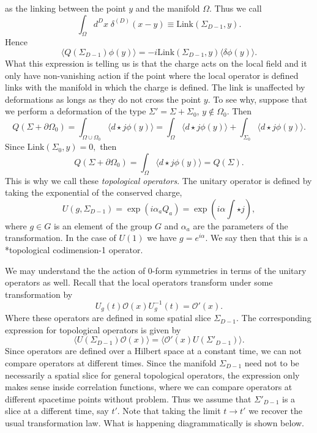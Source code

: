 \documentclass{article}
\begin{document}
as the linking between the point $y$ and the manifold $\Omega$. Thus we call  
$$
\int_{\Omega}d^Dx\;\delta^{(D)}(x-y)\equiv \text{Link}(\Sigma_{D-1},y).
$$
Hence
$$
\langle Q(\Sigma_{D-1})\phi(y)\rangle=-i\text{Link}(\Sigma_{D-1},y)\langle\delta\phi(y)\rangle.
$$
What this expression is telling us is that the charge acts on the local field and it only have non-vanishing action if the point where the local operator is defined links with the manifold in which the charge is defined. The link is unaffected by deformations as longs as they do not cross the point $y$.  To see why, suppose that we perform a deformation of the type $\Sigma'=\Sigma+\Sigma_0$, $y\not\in\Omega_0.$ Then 
$$
Q(\Sigma+\partial\Omega_0)=\int_{\Omega\cup\Omega_0}\langle d\star j\phi(y)\rangle=\int_{\Omega}\langle d\star j\phi(y)\rangle+\int_{\Sigma_0}\langle d\star j\phi(y)\rangle.
$$
Since $\text{Link}(\Sigma_0,y)=0,$ then
$$
Q(\Sigma+\partial\Omega_0)=\int_{\Omega}\langle d\star j\phi(y)\rangle=Q(\Sigma).
$$
This is why we call these \textit{topological operators}. The unitary operator is defined by taking the exponential of the conserved charge,
$$
U(g,\Sigma_{D-1})=\exp(i\alpha_aQ_a)=\exp\left(i\alpha\int\star j\right),
$$
where $g\in G$  is an element of the group $G$ and $\alpha_a$ are the parameters of the transformation. In the case of  $U(1)$  we have $g=e^{i\alpha}$.  We say then that this is a *topological codimension-1 operator. 

We may understand the the action of 0-form symmetries in terms of the unitary operators as well. Recall that the local operators transform under some transformation by
$$
U_g(t)\mathcal{O}(x)U^{-1}_g(t)=\mathcal{O}'(x).
$$
Where these operators are defined in some spatial slice $\Sigma_{D-1}$. The corresponding expression for topological operators is given by 
$$
\langle U(\Sigma_{D-1})\mathcal{O}(x)\rangle=\langle \mathcal{O}'(x)U(\Sigma'_{D-1})\rangle.
$$
Since operators are defined over a Hilbert space at a constant time, we can not compare operators at different times. Since the manifold $\Sigma_{D-1}$ need not to be necessarily a spatial slice for general topological operators, the expression only makes sense inside correlation functions, where we can compare operators at different spacetime points without problem. Thus we assume that $\Sigma'_{D-1}$ is a slice at a different time, say $t'$. Note that taking the limit $t\to t'$ we recover the usual transformation law. What is happening diagrammatically is shown below. 
\end{document}
